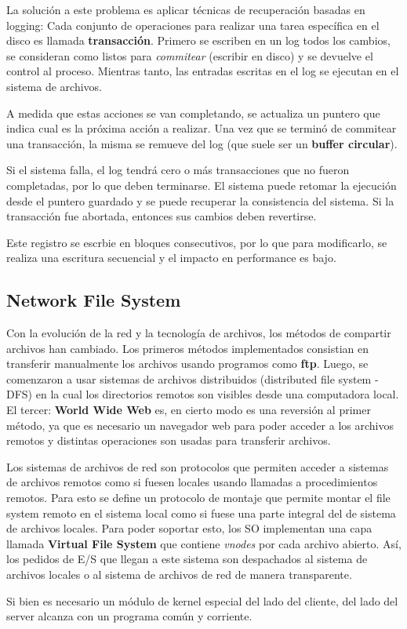 La solución a este problema es aplicar técnicas de recuperación basadas en logging: Cada conjunto de operaciones para realizar una tarea específica en el disco es llamada \textbf{transacción}. Primero se escriben en un log todos los cambios, se consideran como listos para \textit{commitear} (escribir en disco) y se devuelve el control al proceso. Mientras tanto, las entradas escritas en el log se ejecutan en el sistema de archivos.

A medida que estas acciones se van completando, se actualiza un puntero que indica cual es la próxima acción a realizar. Una vez que se terminó de commitear una transacción, la misma se remueve del log (que suele ser un \textbf{buffer circular}).

Si el sistema falla, el log tendrá cero o más transacciones que no fueron completadas, por lo que deben terminarse. El sistema puede retomar la ejecución desde el puntero guardado y se puede recuperar la consistencia del sistema. Si la transacción fue abortada, entonces sus cambios deben revertirse. 

Este registro se escrbie en bloques consecutivos, por lo que para modificarlo, se realiza una escritura secuencial y el impacto en performance es bajo.

\subsection{Network File System}
Con la evolución de la red y la tecnología de archivos, los métodos de compartir archivos han cambiado. Los primeros métodos implementados consistian en transferir manualmente los archivos usando programos como \textbf{ftp}. Luego, se comenzaron a usar sistemas de archivos distribuidos (distributed file system - DFS) en la cual los directorios remotos son visibles desde una computadora local. El tercer: \textbf{World Wide Web} es, en cierto modo es una reversión al primer método, ya que es necesario un navegador web para poder acceder a los archivos remotos y distintas operaciones son usadas para transferir archivos.

Los sistemas de archivos de red son protocolos que permiten acceder a sistemas de archivos remotos como si fuesen locales usando llamadas a procedimientos remotos. Para esto se define un protocolo de montaje que permite montar el file system remoto en el sistema local como si  fuese una parte integral del de sistema de archivos locales. Para poder soportar esto, los SO implementan una capa llamada \textbf{Virtual File System} que contiene \textit{vnodes} por cada archivo abierto. Así, los pedidos de E/S que llegan a este sistema son despachados al sistema de archivos locales o al sistema de archivos de red de manera transparente.

Si bien es necesario un módulo de kernel especial del lado del cliente, del lado del server alcanza con un programa común y corriente.
\printbibliography[keyword=filesystem, title=Bibliografía]